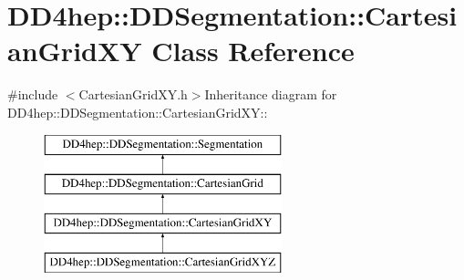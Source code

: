 \hypertarget{class_d_d4hep_1_1_d_d_segmentation_1_1_cartesian_grid_x_y}{
\section{DD4hep::DDSegmentation::CartesianGridXY Class Reference}
\label{class_d_d4hep_1_1_d_d_segmentation_1_1_cartesian_grid_x_y}
}


{\ttfamily \#include $<$CartesianGridXY.h$>$}Inheritance diagram for DD4hep::DDSegmentation::CartesianGridXY::\begin{figure}[H]
\begin{center}
\leavevmode
\includegraphics[height=4cm]{class_d_d4hep_1_1_d_d_segmentation_1_1_cartesian_grid_x_y}
\end{center}
\end{figure}
